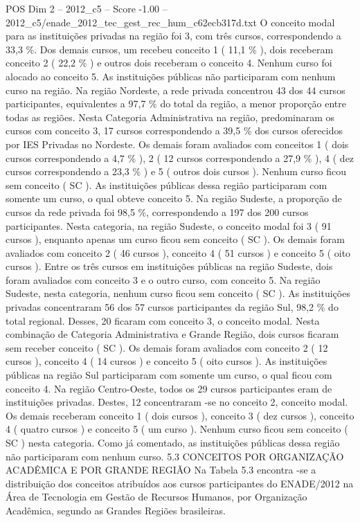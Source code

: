 \begin{textsample}{POS Dim 2 – 2012\_c5 – Score -1.00 – 2012\_c5/enade\_2012\_tec\_gest\_rec\_hum\_c62ecb317d.txt}
O conceito modal para as instituições privadas na região foi 3, com três cursos, correspondendo a 33,3 \%.
Dos demais cursos, um recebeu conceito 1 ( 11,1 \% ), dois receberam conceito 2 ( 22,2 \% ) e outros dois receberam o conceito 4.
Nenhum curso foi alocado ao conceito 5.
As instituições públicas não participaram com nenhum curso na região.
Na região Nordeste, a rede privada concentrou 43 dos 44 cursos participantes, equivalentes a 97,7 \% do total da região, a menor proporção entre todas as regiões.
Nesta Categoria Administrativa na região, predominaram os cursos com conceito 3, 17 cursos correspondendo a 39,5 \% dos cursos oferecidos por IES Privadas no Nordeste.
Os demais foram avaliados com conceitos 1 ( dois cursos correspondendo a 4,7 \% ), 2 ( 12 cursos correspondendo a 27,9 \% ), 4 ( dez cursos correspondendo a 23,3 \% ) e 5 ( outros dois cursos ).
Nenhum curso ficou sem conceito ( SC ).
As instituições públicas dessa região participaram com somente um curso, o qual obteve conceito 5.
Na região Sudeste, a proporção de cursos da rede privada foi 98,5 \%, correspondendo a 197 dos 200 cursos participantes.
Nesta categoria, na região Sudeste, o conceito modal foi 3 ( 91 cursos ), enquanto apenas um curso ficou sem conceito ( SC ).
Os demais foram avaliados com conceito 2 ( 46 cursos ), conceito 4 ( 51 cursos ) e conceito 5 ( oito cursos ).
Entre os três cursos em instituições públicas na região Sudeste, dois foram avaliados com conceito 3 e o outro curso, com conceito 5.
Na região Sudeste, nesta categoria, nenhum curso ficou sem conceito ( SC ).
As instituições privadas concentraram 56 dos 57 cursos participantes da região Sul, 98,2 \% do total regional.
Desses, 20 ficaram com conceito 3, o conceito modal.
Nesta combinação de Categoria Administrativa e Grande Região, dois cursos ficaram sem receber conceito ( SC ).
Os demais foram avaliados com conceito 2 ( 12 cursos ), conceito 4 ( 14 cursos ) e conceito 5 ( oito cursos ).
As instituições públicas na região Sul participaram com somente um curso, o qual ficou com conceito 4.
Na região Centro-Oeste, todos os 29 cursos participantes eram de instituições privadas.
Destes, 12 concentraram -se no conceito 2, conceito modal.
Os demais receberam conceito 1 ( dois cursos ), conceito 3 ( dez cursos ), conceito 4 ( quatro cursos ) e conceito 5 ( um curso ).
Nenhum curso ficou sem conceito ( SC ) nesta categoria.
Como já comentado, as instituições públicas dessa região não participaram com nenhum curso. 5.3 CONCEITOS POR ORGANIZAÇÃO ACADÊMICA E POR GRANDE REGIÃO Na Tabela 5.3 encontra -se a distribuição dos conceitos atribuídos aos cursos participantes do ENADE/2012 na Área de Tecnologia em Gestão de Recursos Humanos, por Organização Acadêmica, segundo as Grandes Regiões brasileiras.

\end{textsample}
